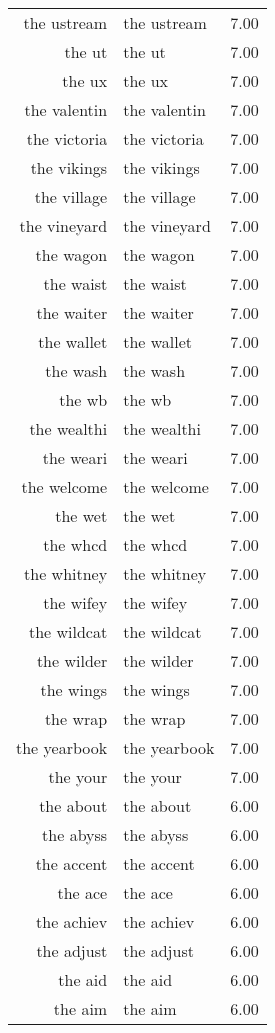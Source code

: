 \begin{table}[ht]
\begin{tabular}{rlr}
  the ustream & the ustream & 7.00 \\ 
  the ut & the ut & 7.00 \\ 
  the ux & the ux & 7.00 \\ 
  the valentin & the valentin & 7.00 \\ 
  the victoria & the victoria & 7.00 \\ 
  the vikings & the vikings & 7.00 \\ 
  the village & the village & 7.00 \\ 
  the vineyard & the vineyard & 7.00 \\ 
  the wagon & the wagon & 7.00 \\ 
  the waist & the waist & 7.00 \\ 
  the waiter & the waiter & 7.00 \\ 
  the wallet & the wallet & 7.00 \\ 
  the wash & the wash & 7.00 \\ 
  the wb & the wb & 7.00 \\ 
  the wealthi & the wealthi & 7.00 \\ 
  the weari & the weari & 7.00 \\ 
  the welcome & the welcome & 7.00 \\ 
  the wet & the wet & 7.00 \\ 
  the whcd & the whcd & 7.00 \\ 
  the whitney & the whitney & 7.00 \\ 
  the wifey & the wifey & 7.00 \\ 
  the wildcat & the wildcat & 7.00 \\ 
  the wilder & the wilder & 7.00 \\ 
  the wings & the wings & 7.00 \\ 
  the wrap & the wrap & 7.00 \\ 
  the yearbook & the yearbook & 7.00 \\ 
  the your & the your & 7.00 \\ 
  the about & the about & 6.00 \\ 
  the abyss & the abyss & 6.00 \\ 
  the accent & the accent & 6.00 \\ 
  the ace & the ace & 6.00 \\ 
  the achiev & the achiev & 6.00 \\ 
  the adjust & the adjust & 6.00 \\ 
  the aid & the aid & 6.00 \\ 
  the aim & the aim & 6.00 \\ 

\end{tabular}
\end{table}
